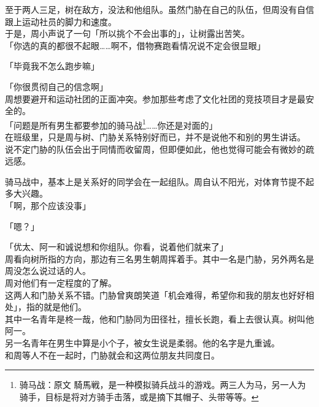 至于两人三足，树在敌方，没法和他组队。虽然门胁在自己的队伍，但周没有自信跟上运动社员的脚力和速度。\\

于是，周小声说了一句「所以挑个不会出事的」，让树露出苦笑。\\

「你选的真的都很不起眼……啊不，借物赛跑看情况说不定会很显眼」

「毕竟我不怎么跑步嘛」

「你很贯彻自己的信念啊」\\

周想要避开和运动社团的正面冲突。参加那些考虑了文化社团的竞技项目才是最安全的。\\

「问题是所有男生都要参加的骑马战\footnote{骑马战：原文 {\jpfont 騎馬戦}，是一种模拟骑兵战斗的游戏。两三人为马，另一人为骑手，目标是将对方骑手击落，或是摘下其帽子、头带等等。}……你还是对面的」\\

在班级里，只是周与树、门胁关系特别好而已，并不是说他不和别的男生讲话。\\

说不定门胁的队伍会出于同情而收留周，但即便如此，他也觉得可能会有微妙的疏远感。

骑马战中，基本上是关系好的同学会在一起组队。周自认不阳光，对体育节提不起多大兴趣。\\

「啊，那个应该没事」

「嗯？」

「优太、阿一和诚说想和你组队。你看，说着他们就来了」\\

周看向树所指的方向，那边有三名男生朝周挥着手。其中一名是门胁，另外两名是周没怎么说过话的人。\\

周对他们有一定程度的了解。\\

这两人和门胁关系不错。门胁曾爽朗笑道「机会难得，希望你和我的朋友也好好相处」，指的就是他们。\\

其中一名青年是柊一哉，他和门胁同为田径社，擅长长跑，看上去很认真。树叫他阿一。\\

另一名青年在男生中算是小个子，被女生说是柔弱。他的名字是九重诚。\\

和周等人不在一起时，门胁就会和这两位朋友共同度日。\\

